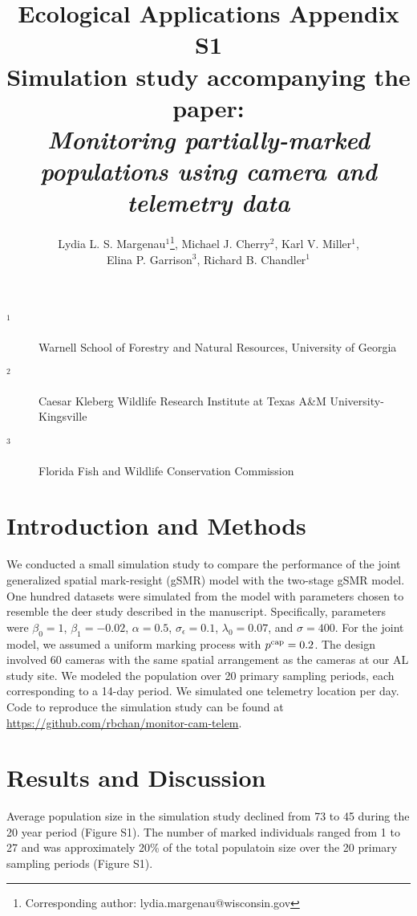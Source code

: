 \documentclass[12pt]{article}
\title{Ecological Applications Appendix S1 \\ Simulation study accompanying the paper: \\ \it Monitoring partially-marked populations using camera and telemetry data }
\author{Lydia L. S. Margenau$^{1}$\footnote{Corresponding author: lydia.margenau@wisconsin.gov}, Michael J. Cherry$^2$,  Karl V. Miller$^1$, \\ Elina P. Garrison$^3$, Richard B. Chandler$^1$}
\begin{document}
\maketitle

\vspace{12pt}

\begin{description}%
\item[$^1$] Warnell School of Forestry and Natural Resources, University of Georgia %
\item[$^2$] Caesar Kleberg Wildlife Research Institute at Texas A\&M University-Kingsville %
\item[$^3$] Florida Fish and Wildlife Conservation Commission %
\end{description}

\clearpage

\section*{Introduction and Methods}

We conducted a small simulation study to compare the performance of
the joint generalized spatial mark-resight (gSMR) model with the
two-stage gSMR model. One hundred datasets were simulated from the
model with parameters chosen to resemble the deer study described in
the manuscript. Specifically, parameters were $\beta_0=1$,
$\beta_1=-0.02$, $\alpha=0.5$, $\sigma_{\epsilon}=0.1$,
$\lambda_0=0.07$, and $\sigma=400$. For the joint model, we assumed a
uniform marking process with $p^{\rm cap}=0.2$. The design involved 60
cameras with the same spatial arrangement as the cameras at our AL
study site. We modeled the population over 20 primary sampling
periods, each corresponding to a 14-day period. We simulated one
telemetry location per day. Code to reproduce the simulation study can
be found at \url{https://github.com/rbchan/monitor-cam-telem}.


\section*{Results and Discussion}

Average population size in the simulation study declined from 73 to 45
during the 20 year period (Figure S1). The number of marked
individuals ranged from 1 to 27 and was approximately 20\% of the
total populatoin size over the 20 primary sampling periods (Figure S1). 
\end{document}
